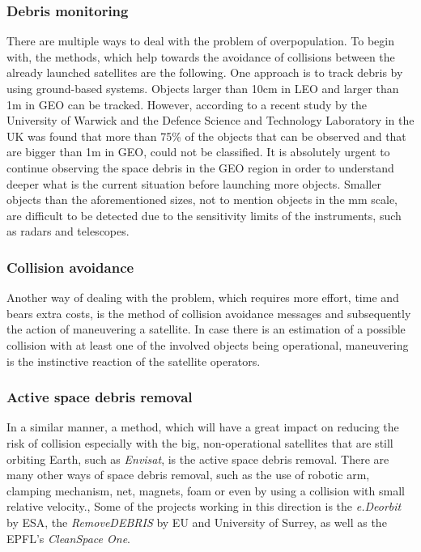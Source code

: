 \subsubsection{Debris monitoring}
There are multiple ways to deal with the problem of overpopulation. %
To begin with, the methods, which help towards the avoidance of collisions between the already launched satellites are the following. One approach is to track debris by using ground-based systems. Objects larger than 10cm in LEO and larger than 1m in GEO can be tracked. \cite{Kramer 2002} However, according to a recent study by the University of Warwick and the Defence Science and Technology Laboratory in the UK was found that more than 75\% of the objects that can be observed and that are bigger than 1m in GEO, could not be classified. It is absolutely urgent to continue observing the space debris in the GEO region in order to understand deeper what is the current situation before launching more objects. \cite{Blake} %
 Smaller objects than the aforementioned sizes, not to mention objects in the mm scale, are difficult to be detected due to the sensitivity limits of the instruments, such as radars and telescopes.

\bigskip
\subsubsection{Collision avoidance}
Another way of dealing with the problem, which requires more effort, time and bears extra costs, is the method of collision avoidance messages and subsequently the action of maneuvering a satellite. In case there is an estimation of a possible collision with at least one of the involved objects being operational, maneuvering is the instinctive reaction of the satellite operators.

\bigskip
\subsubsection{Active space debris removal}
In a similar manner, a method, which will have a great impact on reducing the risk of collision especially with the big, non-operational satellites that are still orbiting Earth, such as \textit{Envisat}, is the active space debris removal. There are many other ways of space debris removal, such as the use of robotic arm, clamping mechanism, net, magnets, foam or even by using a collision with small relative velocity.\cite{active}, \cite{takeichi} Some of the projects working in this direction is the \textit{e.Deorbit} by ESA, the \textit{RemoveDEBRIS} by EU and University of Surrey, as well as the EPFL's \textit{CleanSpace One}.

